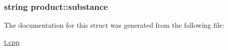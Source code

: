 \subsubsection[{\texorpdfstring{substance}{substance}}]{\setlength{\rightskip}{0pt plus 5cm}string product\+::substance}\hypertarget{structproduct_a9419ebf0b7d9d0e00ffc4ea9df510fb4}{}\label{structproduct_a9419ebf0b7d9d0e00ffc4ea9df510fb4}


The documentation for this struct was generated from the following file\+:\begin{DoxyCompactItemize}
\item 
\hyperlink{t_8cpp}{t.\+cpp}\end{DoxyCompactItemize}
